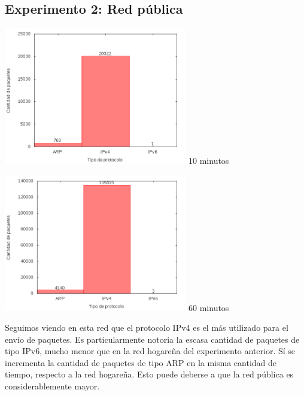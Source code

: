 \subsection{Experimento 2: Red pública}


\begin{minipage}{8cm}
  \centering
  \includegraphics[width=8cm]{../mediciones/altop-wifi-10/altop10Protocolos.png}
  10 minutos
\end{minipage}%
\begin{minipage}{8cm}
  \centering
  \includegraphics[width=8cm]{../mediciones/altop-wifi-60/altop60Protocolos.png}
  60 minutos
\end{minipage}


Seguimos viendo en esta red que el protocolo IPv4 es el más utilizado para el envío de paquetes. Es particularmente notoria la escasa
cantidad de paquetes de tipo IPv6, mucho menor que en la red hogareña del experimento anterior. Sí se incrementa la cantidad de paquetes
de tipo ARP en la misma cantidad de tiempo, respecto a la red hogareña. Esto puede deberse a que la red pública es considerablemente mayor.


